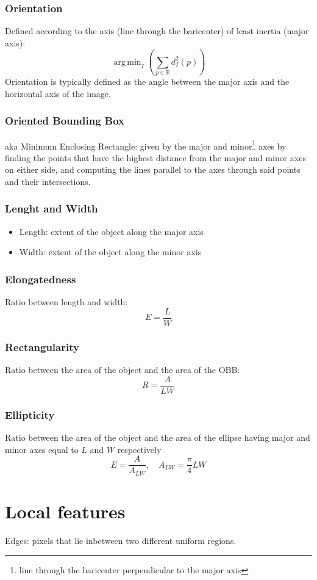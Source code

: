 \documentclass{article}
\DeclareMathOperator*{\argmin}{arg\,min}
\begin{document}
\subsubsection{Orientation}
Defined according to the axis (line through the baricenter) of least inertia (major axis):
\[
    \argmin_I\left( \displaystyle\sum_{p\in\mathbb{R}}^{}d_I^2(p)\right)
\]
Orientation is typically defined as the angle between the major axis and the horizontal axis of the image.
\subsubsection{Oriented Bounding Box}
aka Minimum Enclosing Rectangle: given by the major and minor\footnote{line through the baricenter perpendicular to the major axis} axes by finding the points that have the highest distance from the major and minor axes on either side, and computing the lines parallel to the axes through said points and their intersections. 
\subsubsection{Lenght and Width}
\begin{itemize}
    \item Length: extent of the object along the major axis
    \item Width: extent of the object along the minor axis
\end{itemize}
\subsubsection{Elongatedness}
Ratio between length and width:
\[
    E=\displaystyle\frac{L}{W}
\]
\subsubsection{Rectangularity}
Ratio between the area of the object and the area of the OBB:
\[
    R=\displaystyle\frac{A}{LW}
\]
\subsubsection{Ellipticity}
Ratio between the area of the object and the area of the ellipse having major and minor axes equal to $L$ and $W$ respectively
\[
    E=\displaystyle\frac{A}{A_{LW}},\quad A_{LW}=\displaystyle\frac{\pi}{4}LW
\]

\section{Local features}
Edges: pixels that lie inbetween two different uniform regions. 
\end{document}
